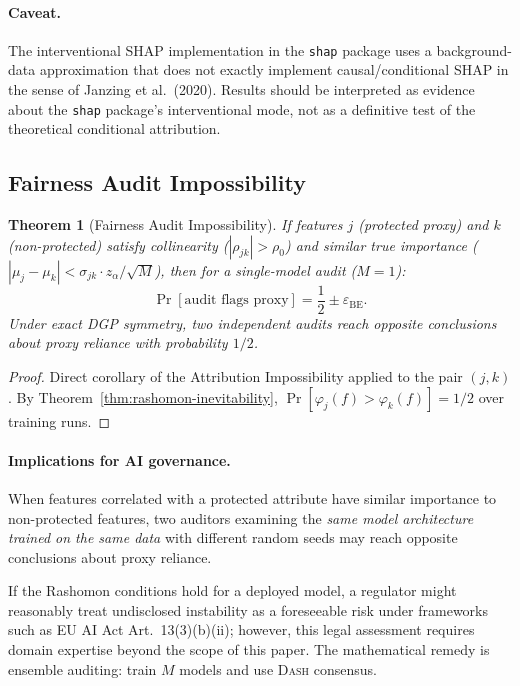 \documentclass{article}
\newtheorem{theorem}{Theorem}
\newcommand{\DASH}{\textsc{Dash}}
\begin{document}
\paragraph{Caveat.}
The interventional SHAP implementation in the \texttt{shap} package uses a background-data approximation that does not exactly implement causal/conditional SHAP in the sense of Janzing et al.\ (2020). Results should be interpreted as evidence about the \texttt{shap} package's interventional mode, not as a definitive test of the theoretical conditional attribution.

\subsection{Fairness Audit Impossibility}
\label{sec:fairness}

\begin{theorem}[Fairness Audit Impossibility]
\label{thm:fairness-audit}
If features $j$ (protected proxy) and $k$ (non-protected) satisfy collinearity ($|\rho_{jk}| > \rho_0$) and similar true importance ($|\mu_j - \mu_k| < \sigma_{jk} \cdot z_\alpha / \sqrt{M}$), then for a single-model audit ($M{=}1$):
\[
    \Pr[\text{audit flags proxy}] = \frac{1}{2} \pm \varepsilon_{\text{BE}}.
\]
Under exact DGP symmetry, two independent audits reach opposite conclusions about proxy reliance with probability $1/2$.
\end{theorem}

\begin{proof}
Direct corollary of the Attribution Impossibility applied to the pair $(j, k)$. By Theorem~\ref{thm:rashomon-inevitability}, $\Pr[\varphi_j(f) > \varphi_k(f)] = 1/2$ over training runs.
\end{proof}

\paragraph{Implications for AI governance.}
When features correlated with a protected attribute have similar importance to non-protected features, two auditors examining the \emph{same model architecture trained on the same data} with different random seeds may reach opposite conclusions about proxy reliance.

If the Rashomon conditions hold for a deployed model, a regulator might reasonably treat undisclosed instability as a foreseeable risk under frameworks such as EU AI Act Art.~13(3)(b)(ii); however, this legal assessment requires domain expertise beyond the scope of this paper. The mathematical remedy is ensemble auditing: train $M$ models and use \DASH{} consensus.
\end{document}
